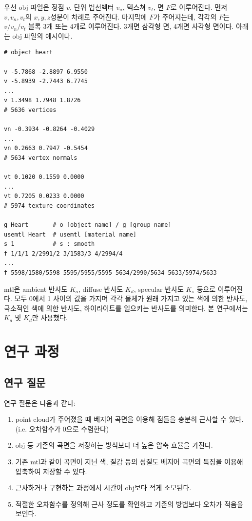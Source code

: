 \documentclass[10pt]{gshs-report-v2.0}
\theoremstyle{theorem}
\theoremstyle{lemma}
\theoremstyle{definition}
\begin{document}
우선 obj 파일은 정점 $v$, 단위 법선벡터 $v_n$, 텍스쳐 $v_t$, 면 $F$로 이루어진다. 먼저 $v, v_n, v_t$의 $x, y, z$성분이 차례로 주어진다. 마지막에 $F$가 주어지는데, 각각의 $F$는 $v/v_n/v_t$ 블록 3개 또는 4개로 이루어진다. 3개면 삼각형 면, 4개면 사각형 면이다. 아래는 obj 파일의 예시이다. 
\begin{Verbatim}
# object heart

v -5.7868 -2.8897 6.9550
v -5.8939 -2.7443 6.7745
...
v 1.3498 1.7948 1.8726
# 5636 vertices

vn -0.3934 -0.8264 -0.4029
...
vn 0.2663 0.7947 -0.5454
# 5634 vertex normals

vt 0.1020 0.1559 0.0000
...
vt 0.7205 0.0233 0.0000
# 5974 texture coordinates

g Heart       # o [object name] / g [group name] 
usemtl Heart  # usemtl [material name]
s 1           # s : smooth
f 1/1/1 2/2991/2 3/1583/3 4/2994/4
...
f 5598/1580/5598 5595/5955/5595 5634/2990/5634 5633/5974/5633
\end{Verbatim}

mtl은 ambient 반사도 $K_a$, diffuse 반사도 $K_d$, specular 반사도 $K_s$ 등으로 이루어진다. 모두 0에서 1 사이의 값을 가지며 각각 물체가 원래 가지고 있는 색에 의한 반사도, 국소적인 색에 의한 반사도, 하이라이트를 일으키는 반사도를 의미한다. 본 연구에서는 $K_a$ 및 $K_d$만 사용했다. 

\section{연구 과정}

\subsection{연구 질문}
연구 질문은 다음과 같다:
\begin{enumerate}
	\item point cloud가 주어졌을 때 베지어 곡면을 이용해 점들을 충분히 근사할 수 있다. (i.e. 오차함수가 0으로 수렴한다)
	\item obj 등 기존의 곡면을 저장하는 방식보다 더 높은 압축 효율을 가진다.
	\item 기존 mtl과 같이 곡면이 지닌 색, 질감 등의 성질도 베지어 곡면의 특징을 이용해 압축하여 저장할 수 있다.
	\item 근사하거나 구현하는 과정에서 시간이 obj보다 적게 소모된다.
	\item 적절한 오차함수를 정의해 근사 정도를 확인하고 기존의 방법보다 오차가 적음을 보인다. 
\end{enumerate}
\end{document}

